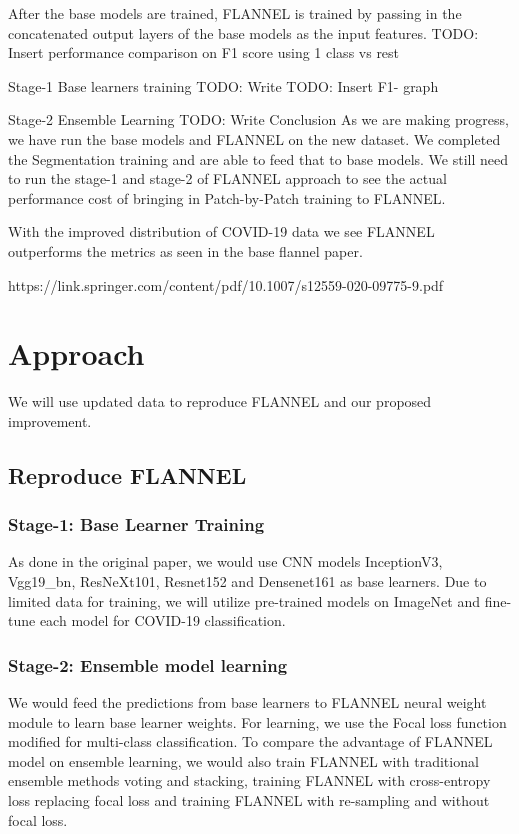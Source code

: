 \documentclass{sigkddExp}
\begin{document}
After the base models are trained, FLANNEL is trained by passing in the concatenated output layers of the base models as the input features.
TODO: Insert performance comparison on F1 score using 1 class vs rest

Stage-1 Base learners training
TODO: Write
TODO: Insert F1- graph


Stage-2 Ensemble Learning
TODO: Write
Conclusion
As we are making progress, we have run the base models and FLANNEL on the new dataset. We completed the Segmentation training and are able to feed that to base models. We still need to run the stage-1 and stage-2 of FLANNEL approach to see the actual performance cost of bringing in Patch-by-Patch training to FLANNEL.

With the improved distribution of COVID-19 data we see FLANNEL outperforms the metrics as seen in the base flannel paper.

https://link.springer.com/content/pdf/10.1007/s12559-020-09775-9.pdf


\section{Approach}

We will use updated data to reproduce FLANNEL and our proposed improvement.

\subsection{Reproduce FLANNEL}
\subsubsection{Stage-1: Base Learner Training}
As done in the original paper, we would use CNN models InceptionV3, Vgg19\_bn,
ResNeXt101, Resnet152 and Densenet161 as base learners. Due to limited data for
training, we will utilize pre-trained models on ImageNet and fine-tune each
model for COVID-19 classification.

\subsubsection{Stage-2: Ensemble model learning}
We would feed the predictions from base learners to FLANNEL neural weight module
to learn base learner weights. For learning, we use the Focal loss function
modified for multi-class classification. To compare the advantage of FLANNEL
model on ensemble learning, we would also train FLANNEL with traditional
ensemble methods voting and stacking, training FLANNEL with cross-entropy loss
replacing focal loss and training FLANNEL with re-sampling and without focal
loss.
\end{document}
